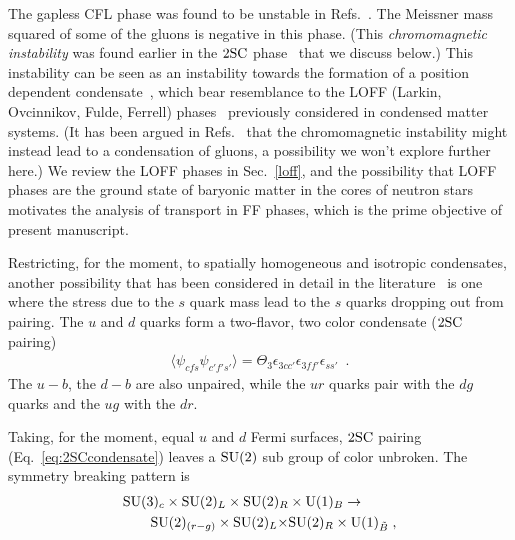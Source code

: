 \documentclass[10pt, aps, prd, superscriptaddress, nofootinbib, 
               amsmath, amssymb, twocolumn,
               preprintnumbers, showpacs,
               raggedbottom,
               floatfix]{revtex4-1}
\newcommand{\SU}{{\rm{SU}}}
\newcommand{\U}{{\rm{U}}}
\newcommand{\SC}{{\rm{SC}}}
\begin{document}
The gapless CFL phase was found to be
unstable in
Refs.~\cite{Casalbuoni:2004tb,Fukushima:2005cm,Alford:2005qw}. The Meissner mass squared of some of the gluons is
negative in this phase. (This {\it{chromomagnetic instability}} was found
earlier in the $2\SC$ phase~\cite{Huang:2004bg,Huang:2004am} that we discuss below.) This
instability can be seen as an instability towards the formation of a position
dependent condensate~\cite{Giannakis:2004pf,Fukushima:2006su}, which bear resemblance to the
LOFF (Larkin, Ovcinnikov, Fulde, Ferrell)
phases~\cite{fulde1964superconductivity,larkin1964nonuniform} previously
considered in condensed matter systems.  (It has been argued in
Refs.~\cite{Gorbar:2005rx,Kiriyama:2006ui} that the chromomagnetic instability
might instead lead to a condensation of gluons, a possibility we won't explore
further here.) We review the LOFF phases in
Sec.~\ref{loff}, and the possibility that LOFF phases are the ground state of
baryonic matter in the cores of neutron stars motivates the analysis of
transport in FF phases, which is the prime objective of present manuscript. 

Restricting, for the moment, to spatially homogeneous and isotropic condensates,
another possibility that has been considered in detail in the
literature~\cite{Alford:1997zt,Rapp:1997zu} is one where the stress due to the
$s$ quark mass lead to the $s$ quarks dropping out from pairing. The $u$ and
$d$ quarks form a two-flavor, two color condensate ($2{\rm{SC}}$ pairing)
\begin{equation}
\begin{split}
\langle\psi_{cfs} \psi_{c'f's'}\rangle = \Theta_3  
\epsilon_{3cc'}\epsilon_{3ff'}\epsilon_{ss'}~\label{eq:2SCcondensate}\;.
\end{split}
\end{equation} 
The $u-b$, the $d-b$ are also unpaired, while the $ur$ quarks pair with the
$dg$ quarks and the $ug$ with the $dr$.

Taking, for the moment, equal $u$ and $d$ Fermi surfaces, $2{\rm{SC}}$ pairing
(Eq.~\ref{eq:2SCcondensate}) leaves a ${\rm{SU}}(2)$ sub group of color
unbroken. The symmetry breaking pattern is 
\begin{equation}
\begin{split}
\SU(3)_c\times\SU(2)_L\times\SU(2)_R&\times {\rm{U}}(1)_B
\rightarrow\\ \SU(2)_{(r-g)}\times\SU(2)_{L}\times&\SU(2)_{R}
\times\U(1)_{\tilde{B}}\label{eq:2SCsymmetry}\;,
\end{split}
\end{equation}
\end{document}
